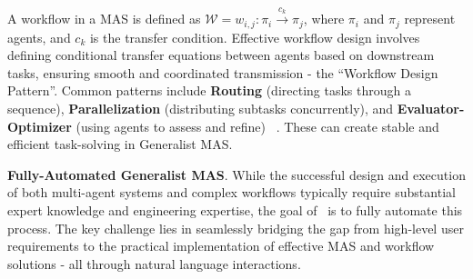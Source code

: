 A workflow in a MAS is defined as $\mathcal{W} = {w_{i,j}: \pi_i \xrightarrow{c_k} \pi_j}$, where $\pi_i$ and $\pi_j$ represent agents, and $c_k$ is the transfer condition. Effective workflow design involves defining conditional transfer equations between agents based on downstream tasks, ensuring smooth and coordinated transmission - the ``Workflow Design Pattern''. Common patterns include \textbf{Routing} (directing tasks through a sequence), \textbf{Parallelization} (distributing subtasks concurrently), and \textbf{Evaluator-Optimizer} (using agents to assess and refine) ~\cite{anthropic2023effectiveagents}. These can create stable and efficient task-solving in Generalist MAS.

\noindent \textbf{Fully-Automated Generalist MAS}. While the successful design and execution of both multi-agent systems and complex workflows typically require substantial expert knowledge and engineering expertise, the goal of \model\ is to fully automate this process. The key challenge lies in seamlessly bridging the gap from high-level user requirements to the practical implementation of effective MAS and workflow solutions - all through natural language interactions.

